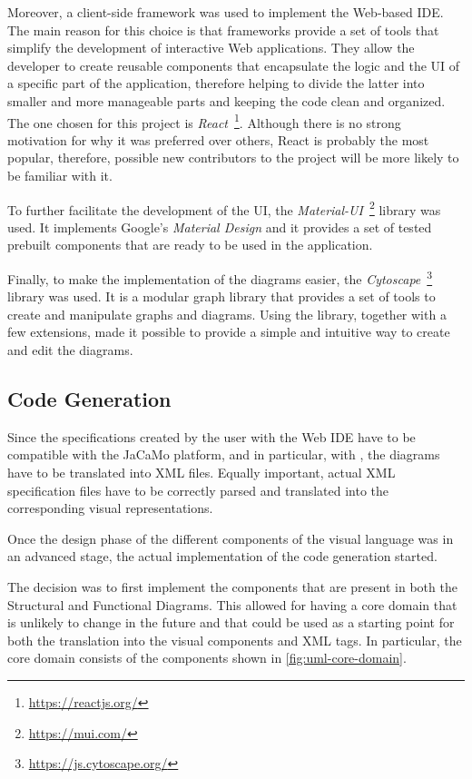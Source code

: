 Moreover, a client-side framework was used to implement the Web-based IDE.
The main reason for this choice is that frameworks provide a set of tools that simplify the development of interactive Web applications.
They allow the developer to create reusable components that encapsulate the logic and the UI of a specific part of the application, therefore helping to divide the latter into smaller and more manageable parts and keeping the code clean and organized.
The one chosen for this project is \textit{React}~\footnote{\url{https://reactjs.org/}}.
Although there is no strong motivation for why it was preferred over others, React is probably the most popular, therefore, possible new contributors to the project will be more likely to be familiar with it.

To further facilitate the development of the UI, the \textit{Material-UI}~\footnote{\url{https://mui.com/}} library was used.
It implements Google's \textit{Material Design} and it provides a set of tested prebuilt components that are ready to be used in the application.

Finally, to make the implementation of the diagrams easier, the \textit{Cytoscape}~\footnote{\url{https://js.cytoscape.org/}} library was used.
It is a modular graph library that provides a set of tools to create and manipulate graphs and diagrams.
Using the library, together with a few extensions, made it possible to provide a simple and intuitive way to create and edit the diagrams.

\subsection{Code Generation}\label{sec:code-generation}
Since the specifications created by the user with the Web IDE have to be compatible with the JaCaMo platform, and in particular, with \moise{}, the diagrams have to be translated into XML files.
Equally important, actual \moise{} XML specification files have to be correctly parsed and translated into the corresponding visual representations.

Once the design phase of the different components of the visual language was in an advanced stage, the actual implementation of the code generation started.

The decision was to first implement the components that are present in both the Structural and Functional Diagrams.
This allowed for having a core domain that is unlikely to change in the future and that could be used as a starting point for both the translation into the visual components and XML tags.
In particular, the core domain consists of the components shown in \cref{fig:uml-core-domain}.

